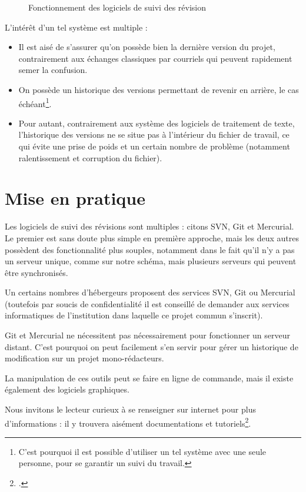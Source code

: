 \begin{figure}[ht]
\centering

\caption{Fonctionnement des logiciels de suivi des révision}\label{svn}
\end{figure}

L'intérêt d'un tel système est multiple :
\begin{itemize}
\item Il est aisé de s'assurer qu'on possède bien la dernière version du projet, contrairement aux échanges classiques par courriels qui peuvent rapidement semer la confusion.
\item On possède un historique des versions permettant de revenir en arrière, le cas échéant\footnote{C'est pourquoi il est possible d'utiliser un tel système avec une seule personne, pour se garantir un suivi du travail.}.
\item Pour autant, contrairement aux système des logiciels de traitement de texte, l'historique des versions ne se situe pas à l'intérieur du fichier de travail, ce qui évite une prise de poids et un certain nombre de problème (notamment ralentissement et corruption du fichier).
\end{itemize}


\section{Mise en pratique}
Les logiciels de suivi des révisions sont multiples : citons SVN, Git et Mercurial. Le premier est sans doute plus simple en première approche, mais les deux autres possèdent des fonctionnalité plus souples, notamment dans le fait qu'il n'y a pas un serveur unique, comme sur notre schéma, mais plusieurs serveurs qui peuvent être synchronisés.

Un certains nombres d'hébergeurs proposent des services SVN, Git ou Mercurial (toutefois par soucis de confidentialité il est conseillé de demander aux services informatiques de l'institution dans laquelle ce projet commun s'inscrit). 

Git et Mercurial ne nécessitent pas nécessairement pour fonctionner un serveur distant. C'est pourquoi on peut facilement s'en servir pour gérer un historique de modification sur un projet mono-rédacteurs.

La manipulation de ces outils peut se faire en ligne de commande, mais il existe également des logiciels graphiques.

Nous invitons le lecteur curieux à se renseigner sur internet pour plus d'informations : il y trouvera aisément documentations et tutoriels\footcite[Nous recommandons, pour Git, cet excellent livre :][]{progit}.
